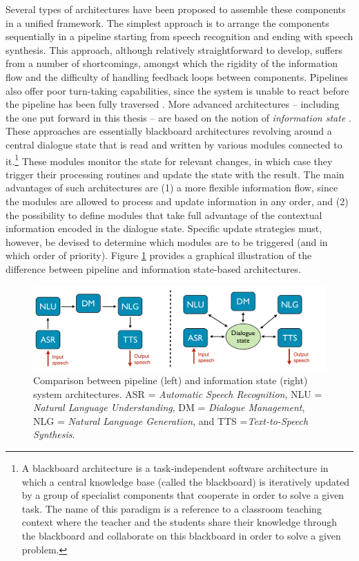 Several types of architectures have been proposed to assemble these components in a unified framework.  The simplest approach is to arrange the components sequentially in a pipeline starting from speech recognition and ending with speech synthesis.  This approach, although relatively straightforward to develop, suffers from a number of shortcomings, amongst which the rigidity of the information flow and the difficulty of handling feedback loops between components. Pipelines also offer poor turn-taking capabilities, since the system is unable to react before the pipeline has been fully traversed \citep{RauxE09}. More advanced architectures -- including the one put forward in this thesis -- are based on the notion of \textit{information state} \citep{Larsson:2000,Bos2003}.  These approaches are essentially blackboard architectures revolving around a central dialogue state that is read and written by various modules connected to it.\footnote{A blackboard architecture is a task-independent software architecture in which a central knowledge base (called the blackboard) is iteratively updated by a group of specialist components that cooperate in order to solve a given task. The name of this paradigm is a reference to a classroom teaching context where the teacher and the students share their knowledge through the blackboard and collaborate on this blackboard in order to solve a given problem.} These modules monitor the state for relevant changes, in which case they trigger their processing routines and update the state with the result.  The main advantages of such architectures are (1) a more flexible information flow, since the modules are allowed to process and update information in any order, and (2) the possibility to define modules that take full advantage of the contextual information encoded in the dialogue state. Specific update strategies must, however, be devised to determine which modules are to be triggered (and in which order of priority). Figure \ref{fig:architecture_comp} provides a graphical illustration of the difference between pipeline and information state-based architectures.  

 \begin{figure}[h!]
\centering
\includegraphics[scale=0.28]{imgs/architecture_comparison.pdf}
\caption{Comparison between pipeline (left) and information state (right) system architectures.   ASR = \textit{Automatic Speech Recognition}, NLU = \textit{Natural Language Understanding}, DM = \textit{Dialogue Management}, NLG = \textit{Natural Language Generation}, and TTS =\textit{Text-to-Speech Synthesis}.}
\label{fig:architecture_comp}
\end{figure}

